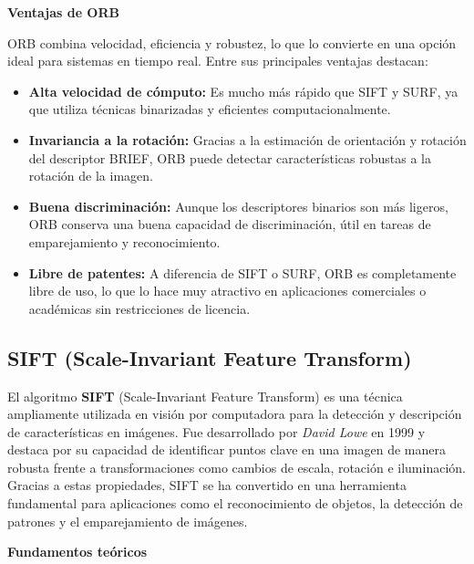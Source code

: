 \documentclass[a4paper]{article}
\begin{document}
    \par\vspace{0.5cm}
    \textbf{Ventajas de ORB}
    \par\vspace{0.5cm}

    ORB combina velocidad, eficiencia y robustez, lo que lo convierte en una opción ideal para sistemas en tiempo real. Entre sus principales ventajas destacan:

    \begin{itemize}
        \item \textbf{Alta velocidad de cómputo:}  
        Es mucho más rápido que SIFT y SURF, ya que utiliza técnicas binarizadas y eficientes computacionalmente.
        
        \item \textbf{Invariancia a la rotación:}  
        Gracias a la estimación de orientación y rotación del descriptor BRIEF, ORB puede detectar características robustas a la rotación de la imagen.

        \item \textbf{Buena discriminación:}  
        Aunque los descriptores binarios son más ligeros, ORB conserva una buena capacidad de discriminación, útil en tareas de emparejamiento y reconocimiento.

        \item \textbf{Libre de patentes:}  
        A diferencia de SIFT o SURF, ORB es completamente libre de uso, lo que lo hace muy atractivo en aplicaciones comerciales o académicas sin restricciones de licencia.
    \end{itemize}


  \subsection{SIFT (Scale-Invariant Feature Transform)}
  \par\vspace{0.5cm}
  
  El algoritmo \textbf{SIFT} (Scale-Invariant Feature Transform) es una técnica ampliamente utilizada en visión por computadora para la detección y descripción de características en imágenes. Fue desarrollado por \textit{David Lowe} en 1999 y destaca por su capacidad de identificar puntos clave en una imagen de manera robusta frente a transformaciones como cambios de escala, rotación e iluminación. Gracias a estas propiedades, SIFT se ha convertido en una herramienta fundamental para aplicaciones como el reconocimiento de objetos, la detección de patrones y el emparejamiento de imágenes.
  \par\vspace{0.5cm}
  \textbf{Fundamentos teóricos}
  \par\vspace{0.5cm}
  
\end{document}
